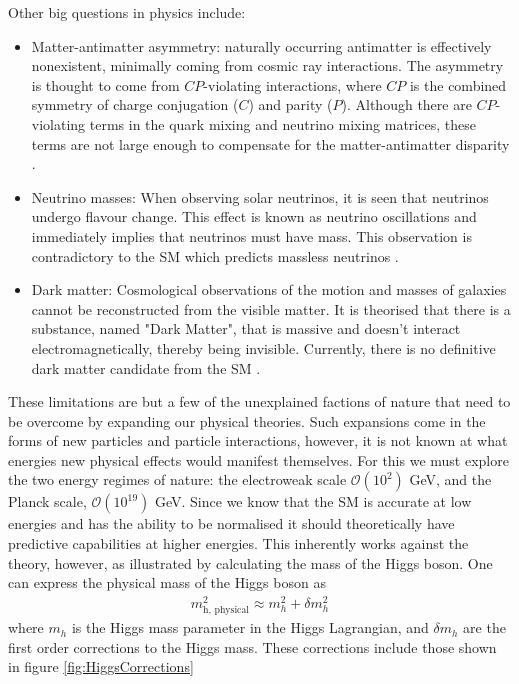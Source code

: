 Other big questions in physics include:
\begin{itemize}
\item Matter-antimatter asymmetry: naturally occurring antimatter is effectively nonexistent, minimally coming from cosmic ray interactions. 
The asymmetry is thought to come from $CP$-violating interactions, where $CP$ is the combined symmetry of charge conjugation ($C$) and parity ($P$).  
Although there are $CP$-violating terms in the quark mixing and neutrino mixing matrices, these terms are not large enough to compensate for the matter-antimatter disparity \cite{canetti2012matter}.

\item Neutrino masses: When observing solar neutrinos, it is seen that neutrinos undergo flavour change. 
This effect is known as neutrino oscillations and immediately implies that neutrinos must have mass.
This observation is contradictory to the SM which predicts massless neutrinos \cite{olive2014review}.

\item Dark matter: Cosmological observations of the motion and masses of galaxies cannot be reconstructed from the visible matter.
It is theorised that there is a substance, named "Dark Matter", that is massive and doesn't interact electromagnetically, thereby being invisible.
Currently, there is no definitive dark matter candidate from the SM \cite{bertone2005particle}. 
\end{itemize}
These limitations are but a few of the unexplained factions of nature that need to be overcome by expanding our physical theories.
Such expansions come in the forms of new particles and particle interactions, however, it is not known at what energies new physical effects would manifest themselves.
For this we must explore the two energy regimes of nature: the electroweak scale $\mathcal{O}(10^{2})$ GeV, and the Planck scale, $\mathcal{O}(10^{19})$ GeV.
Since we know that the SM is accurate at low energies and has the ability to be normalised it should theoretically have predictive capabilities at higher energies.
This inherently works against the theory, however, as illustrated by calculating the mass of the Higgs boson.
One can express the physical mass of the Higgs boson as 
\begin{align}
m_{\textrm{h, physical}}^{2} \approx m_{h}^{2} + \delta m_{h}^{2}
\end{align}
where $m_{h}$ is the Higgs mass parameter in the Higgs Lagrangian, and $\delta m_{h}$ are the first order corrections to the Higgs mass.
These corrections include those shown in figure \ref{fig:HiggsCorrections}

